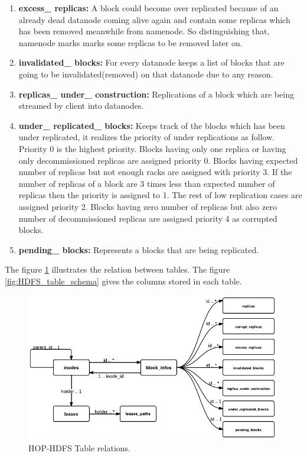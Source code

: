 \begin{enumerate}
\item \textbf{excess\_ replicas:} A  block   could  become  over replicated because of an already  dead
datanode  coming  alive  again  and  contain  some  replicas   which  has   been  removed
meanwhile  from   namenode.  So  distinguishing  that,  namenode  marks   marks   some
replicas to be removed later on.

\item \textbf{invalidated\_ blocks:} For  every   datanode  keeps   a  list  of  blocks   that  are  going  to  be
invalidated(removed) on that datanode due to any reason.

\item \textbf{replicas\_ under\_ construction:} Replications   of  a  block   which  are  being  streamed  by
client into datanodes.

\item \textbf{under\_ replicated\_ blocks:} Keeps   track   of  the  blocks   which  has   been  under
replicated,  it  realizes   the  priority   of  under  replications   as   follow.  Priority   0  is   the
highest  priority.  Blocks   having  only   one  replica  or  having  only   decommissioned
replicas   are  assigned  priority   0.  Blocks   having  expected  number  of  replicas   but  not
enough  racks   are  assigned  with  priority   3.  If  the  number  of  replicas   of  a  block   are  3
times   less   than  expected  number  of  replicas   then  the  priority   is   assigned  to  1.  The
rest  of  low  replication  cases   are  assigned  priority   2.  Blocks   having  zero  number  of
replicas   but  also  zero  number  of  decommissioned replicas  are assigned priority  4 as
corrupted blocks.

\item \textbf{pending\_ blocks:} Represents a blocks that are being replicated.

\end{enumerate}
 The figure \ref{fig:HDFS_table_relation} illustrates the relation between tables. The figure \ref{fig:HDFS_table_schema} gives the columns stored in each table.
\begin{figure}[h!]
  \centering
 \includegraphics[scale=0.5]{figs/preliminar/HOP_table_relation.png}
  \caption{HOP-HDFS Table relations.}
  \label{fig:HDFS_table_relation}
\end{figure}
